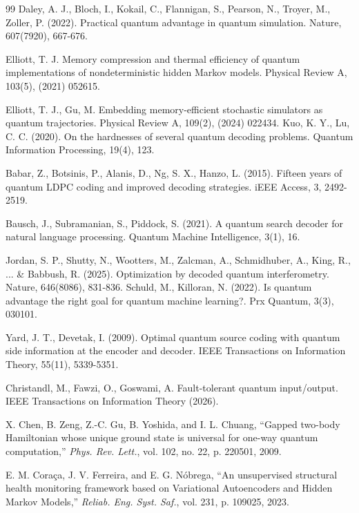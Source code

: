 \documentclass[12pt, reco]{article}
\begin{document}
\begin{thebibliography}{99}
 Daley, A. J., Bloch, I., Kokail, C., Flannigan, S., Pearson, N., Troyer, M.,   Zoller, P. (2022). Practical quantum advantage in quantum simulation. Nature, 607(7920), 667-676.

 Elliott, T. J. Memory compression and thermal efficiency of quantum implementations of nondeterministic hidden Markov models. Physical Review A, 103(5),  (2021) 052615.

 Elliott, T. J.,   Gu, M. Embedding memory-efficient stochastic simulators as quantum trajectories. Physical Review A, 109(2),  (2024)  022434.
 Kuo, K. Y.,   Lu, C. C. (2020). On the hardnesses of several quantum decoding problems. Quantum Information Processing, 19(4), 123.

 Babar, Z., Botsinis, P., Alanis, D., Ng, S. X.,   Hanzo, L. (2015). Fifteen years of quantum LDPC coding and improved decoding strategies. iEEE Access, 3, 2492-2519.

 Bausch, J., Subramanian, S.,   Piddock, S. (2021). A quantum search decoder for natural language processing. Quantum Machine Intelligence, 3(1), 16.

 Jordan, S. P., Shutty, N., Wootters, M., Zalcman, A., Schmidhuber, A., King, R., ... \& Babbush, R. (2025). Optimization by decoded quantum interferometry. Nature, 646(8086), 831-836.
 Schuld, M.,   Killoran, N. (2022). Is quantum advantage the right goal for quantum machine learning?. Prx Quantum, 3(3), 030101.

 Yard, J. T.,   Devetak, I. (2009). Optimal quantum source coding with quantum side information at the encoder and decoder. IEEE Transactions on Information Theory, 55(11), 5339-5351.


 Christandl, M., Fawzi, O.,  Goswami, A. Fault-tolerant quantum input/output. IEEE Transactions on Information Theory  (2026).

X. Chen, B. Zeng, Z.-C. Gu, B. Yoshida, and I. L. Chuang, ``Gapped two-body Hamiltonian whose unique ground state is universal for one-way quantum computation,'' \emph{Phys. Rev. Lett.}, vol. 102, no. 22, p. 220501, 2009.

E. M. Coraça, J. V. Ferreira, and E. G. Nóbrega, ``An unsupervised structural health monitoring framework based on Variational Autoencoders and Hidden Markov Models,'' \emph{Reliab. Eng. Syst. Saf.}, vol. 231, p. 109025, 2023.


\end{thebibliography}
\end{document}
